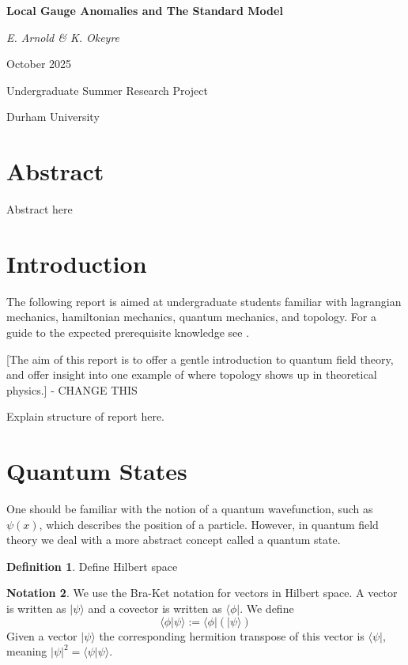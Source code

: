 \documentclass{article}
\theoremstyle{definition}
\newtheorem{defn}{Definition}[section]
\newtheorem{notation}[defn]{Notation}
\theoremstyle{plain}
\begin{document}
\begin{titlepage}
    \centering
    {\huge \bfseries Local Gauge Anomalies and The Standard Model \par}
    \vspace{1cm}
    {\Large \itshape E. Arnold \& K. Okeyre\par}
    \vfill
    {\Large October 2025 \par}
    {\Large Undergraduate Summer Research Project \par}
    {\Large Durham University \par}
\end{titlepage}

\section*{Abstract}
Abstract here
\newpage

\tableofcontents
\newpage

\section{Introduction}

The following report is aimed at undergraduate 
students familiar with lagrangian mechanics, hamiltonian mechanics,
quantum mechanics, and topology. For a guide to the expected prerequisite knowledge see \cite{mathphys1, mathphys2, topnotes}.

[The aim of this report is to offer a gentle 
introduction to quantum field theory, and offer 
insight into one example of where topology shows up 
in theoretical physics.] - CHANGE THIS

Explain structure of report here. 

\section{Quantum States}

One should be familiar with the notion of a quantum wavefunction, such as 
$\psi(x)$, which describes the position of a particle. 
However, in quantum field theory we deal with a more 
abstract concept called a quantum state.

\begin{defn}
Define Hilbert space
\end{defn}

\begin{notation}
We use the Bra-Ket notation for vectors in Hilbert space. A 
vector is written as $| \psi \rangle$ and a covector is 
written as $\langle \phi |$. We define \[ \langle \phi | \psi \rangle := \langle \phi | (| \psi \rangle) \]
Given a vector 
$| \psi \rangle$ the corresponding hermition transpose of 
this vector is $\langle \psi |$, meaning 
$|\psi|^2 = \langle \psi | \psi \rangle$.
\end{notation}
\end{document}
